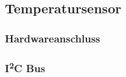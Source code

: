 \subsection{Temperatursensor}
\subsubsection{Hardwareanschluss}
\subsubsection{I\textsuperscript{2}C Bus}
